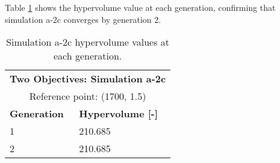 Table \ref{tab:a2c-hypervolume} shows the hypervolume value at each generation, 
confirming that simulation a-2c converges by generation 2. 
\begin{table}[htbp!]
    \centering
    \onehalfspacing
    \caption{Simulation a-2c hypervolume values at each generation.}
	\label{tab:a2c-hypervolume}
    \footnotesize
    \begin{tabular}{ll}
    \hline 
    \multicolumn{2}{c}{\textbf{Two Objectives: Simulation a-2c}} \\
    \multicolumn{2}{c}{Reference point: (1700, 1.5)} \\
    \hline 
    \textbf{Generation} & \textbf{Hypervolume [-]} \\
    \hline
    1 & 210.685 \\
    2 & 210.685 \\
    \hline
    \end{tabular}
\end{table}

